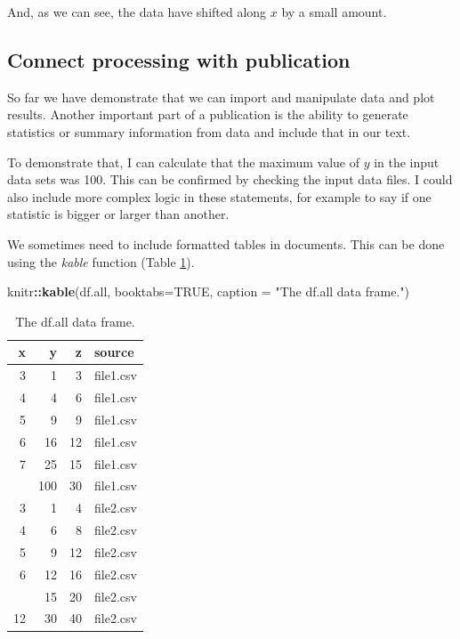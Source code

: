 \documentclass[10pt,]{article}
\newenvironment{Shaded}{\begin{snugshade}}{\end{snugshade}}
\newcommand{\DataTypeTok}[1]{\textcolor[rgb]{0.13,0.29,0.53}{#1}}
\newcommand{\KeywordTok}[1]{\textcolor[rgb]{0.13,0.29,0.53}{\textbf{#1}}}
\newcommand{\NormalTok}[1]{#1}
\newcommand{\OperatorTok}[1]{\textcolor[rgb]{0.81,0.36,0.00}{\textbf{#1}}}
\newcommand{\OtherTok}[1]{\textcolor[rgb]{0.56,0.35,0.01}{#1}}
\newcommand{\StringTok}[1]{\textcolor[rgb]{0.31,0.60,0.02}{#1}}
\begin{document}
And, as we can see, the data have shifted along \(x\) by a small amount.

\hypertarget{connect-processing-with-publication}{%
\subsection{Connect processing with publication}\label{connect-processing-with-publication}}

So far we have demonstrate that we can import and manipulate data and plot results. Another important part of a publication is the ability to generate statistics or summary information from data and include that in our text.

To demonstrate that, I can calculate that the maximum value of \(y\) in the input data sets was 100. This can be confirmed by checking the input data files. I could also include more complex logic in these statements, for example to say if one statistic is bigger or larger than another.

We sometimes need to include formatted tables in documents. This can be done using the \emph{kable} function (Table \ref{tab:dfall}).

\begin{Shaded}
\begin{Highlighting}[]
\NormalTok{knitr}\OperatorTok{::}\KeywordTok{kable}\NormalTok{(df.all,}
             \DataTypeTok{booktabs=}\OtherTok{TRUE}\NormalTok{,}
             \DataTypeTok{caption =} \StringTok{"The df.all data frame."}\NormalTok{)}
\end{Highlighting}
\end{Shaded}

\begin{table}[t]

\caption{\label{tab:dfall}The df.all data frame.}
\centering
\begin{tabular}{rrrl}
\toprule
x & y & z & source\\
\midrule
3 & 1 & 3 & file1.csv\\
4 & 4 & 6 & file1.csv\\
5 & 9 & 9 & file1.csv\\
6 & 16 & 12 & file1.csv\\
7 & 25 & 15 & file1.csv\\
\addlinespace
12 & 100 & 30 & file1.csv\\
3 & 1 & 4 & file2.csv\\
4 & 6 & 8 & file2.csv\\
5 & 9 & 12 & file2.csv\\
6 & 12 & 16 & file2.csv\\
\addlinespace
7 & 15 & 20 & file2.csv\\
12 & 30 & 40 & file2.csv\\
\bottomrule
\end{tabular}
\end{table}
\end{document}
